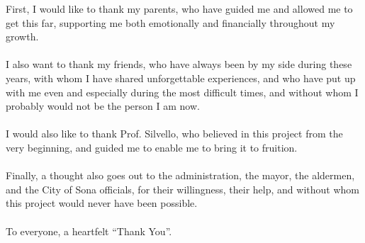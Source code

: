First, I would like to thank my parents, who have guided me and allowed me to get this far, supporting me both emotionally and financially throughout my growth.

\paragraph*{}
I also want to thank my friends, who have always been by my side during these years, with whom I have shared unforgettable experiences, and who have put up with me even and especially during the most difficult times, and without whom I probably would not be the person I am now.

\paragraph*{}
I would also like to thank Prof. Silvello, who believed in this project from the very beginning, and guided me to enable me to bring it to fruition.

\paragraph*{}
Finally, a thought also goes out to the administration, the mayor, the aldermen, and the City of Sona officials, for their willingness, their help, and without whom this project would never have been possible.

\paragraph*{}
To everyone, a heartfelt “Thank You”.